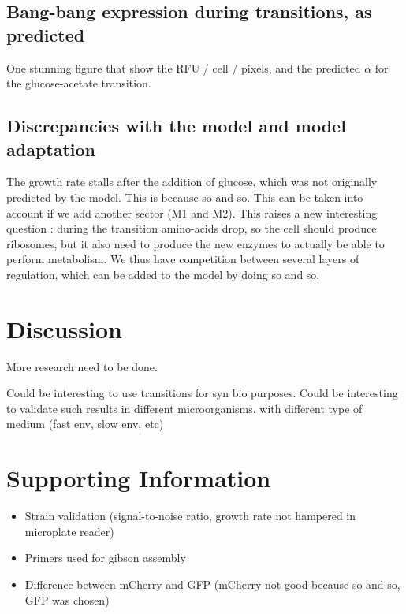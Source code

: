 \subsection{Bang-bang expression during transitions, as predicted}

One stunning figure that show the RFU / cell / pixels, and the predicted $\alpha$ for the glucose-acetate transition.

\subsection{Discrepancies with the model and model adaptation}

The growth rate stalls after the addition of glucose, which was not originally predicted by the model.
This is because so and so.
This can be taken into account if we add another sector (M1 and M2).
This raises a new interesting question : during the transition amino-acids drop, so the cell should produce ribosomes, but it also need to produce the new enzymes to actually be able to perform metabolism.
We thus have competition between several layers of regulation, which can be added to the model by doing so and so.

\section{Discussion}

More research need to be done.

Could be interesting to use transitions for syn bio purposes.
Could be interesting to validate such results in different microorganisms, with different type of medium (fast env, slow env, etc)

\section{Supporting Information}

\begin{itemize}
\item Strain validation (signal-to-noise ratio, growth rate not hampered in microplate reader)
\item Primers used for gibson assembly
\item Difference between mCherry and GFP (mCherry not good because so and so, GFP was chosen)
\end{itemize}